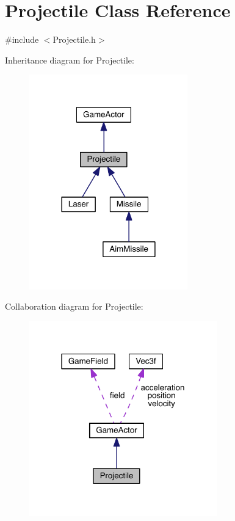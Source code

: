 \hypertarget{class_projectile}{\section{Projectile Class Reference}
\label{class_projectile}
}


{\ttfamily \#include $<$Projectile.\+h$>$}



Inheritance diagram for Projectile\+:\nopagebreak
\begin{figure}[H]
\begin{center}
\leavevmode
\includegraphics[width=194pt]{class_projectile__inherit__graph}
\end{center}
\end{figure}


Collaboration diagram for Projectile\+:\nopagebreak
\begin{figure}[H]
\begin{center}
\leavevmode
\includegraphics[width=231pt]{class_projectile__coll__graph}
\end{center}
\end{figure}
